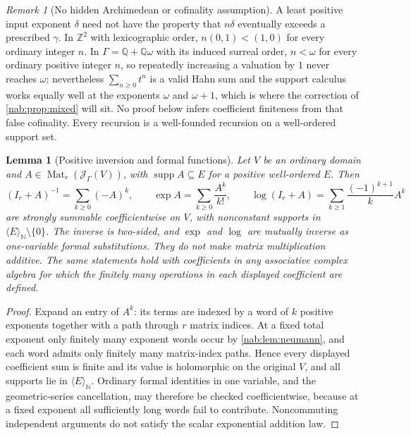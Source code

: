 \documentclass[11pt,letterpaper]{article}
\newtheorem{lemma}[lemma]{Lemma}
\theoremstyle{definition}
\theoremstyle{remark}
\newtheorem{remark}[remark]{Remark}
\newcommand{\Q}{\mathbb Q}
\newcommand{\Z}{\mathbb Z}
\newcommand{\N}{\mathbb N}
\newcommand{\JJ}{\mathscr J_\Gamma}
\newcommand{\Mat}{\operatorname{Mat}}
\newcommand{\supp}{\operatorname{supp}}
\newcommand{\angles}[1]{\langle #1\rangle_{\N}}
\numberwithin{equation}{section}
\begin{document}
\begin{remark}[No hidden Archimedean or cofinality assumption]
\label{nab:rem:nonarch}
A least positive input exponent $\delta$ need not have the property that
$n\delta$ eventually exceeds a prescribed $\gamma$. In $\Z^2$ with
lexicographic order, $n(0,1)<(1,0)$ for every ordinary integer $n$. In
$\Gamma=\Q+\Q\omega$ with its induced surreal order, $n<\omega$ for every
ordinary positive integer $n$, so repeatedly increasing a valuation by $1$
never reaches $\omega$; nevertheless $\sum_{n\geq0}t^n$ is a valid Hahn sum
and the support calculus works equally well at the exponents $\omega$ and
$\omega+1$, which is where the correction of \cref{nab:prop:mixed} will sit.
No proof below infers coefficient finiteness from that false cofinality.
Every recursion is a well-founded recursion on a well-ordered support set.
\end{remark}

\begin{lemma}[Positive inversion and formal functions]\label{nab:lem:inverse}
Let $V$ be an ordinary domain and $A\in\Mat_r(\JJ(V))$, with
$\supp A\subseteq E$ for a positive well-ordered $E$. Then
\[
 (I_r+A)^{-1}=\sum_{k\geq0}(-A)^k,
 \qquad
 \exp A=\sum_{k\geq0}\frac{A^k}{k!},
 \qquad
 \log(I_r+A)=\sum_{k\geq1}\frac{(-1)^{k+1}}{k}A^k
\]
are strongly summable coefficientwise on $V$, with nonconstant supports in
$\angles E\setminus\{0\}$. The inverse is two-sided, and $\exp$ and $\log$ are
mutually inverse as one-variable formal substitutions. They do not make matrix
multiplication additive. The same statements hold with coefficients in any
associative complex algebra for which the finitely many operations in each
displayed coefficient are defined.
\end{lemma}

\begin{proof}
Expand an entry of $A^k$: its terms are indexed by a word of $k$ positive
exponents together with a path through $r$ matrix indices. At a fixed total
exponent only finitely many exponent words occur by \cref{nab:lem:neumann},
and each word admits only finitely many matrix-index paths. Hence every
displayed coefficient sum is finite and its value is holomorphic on the
original $V$, and all supports lie in $\angles E$. Ordinary formal identities
in one variable, and the geometric-series cancellation, may therefore be
checked coefficientwise, because at a fixed exponent all sufficiently long
words fail to contribute. Noncommuting independent arguments do not satisfy
the scalar exponential addition law.
\end{proof}
\end{document}
